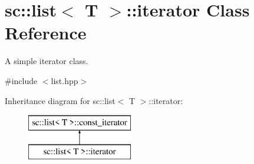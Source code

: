 \hypertarget{classsc_1_1list_1_1iterator}{}\section{sc\+:\+:list$<$ T $>$\+:\+:iterator Class Reference}
\label{classsc_1_1list_1_1iterator}


A simple iterator class.  




{\ttfamily \#include $<$list.\+hpp$>$}

Inheritance diagram for sc\+:\+:list$<$ T $>$\+:\+:iterator\+:\begin{figure}[H]
\begin{center}
\leavevmode
\includegraphics[height=2.000000cm]{classsc_1_1list_1_1iterator}
\end{center}
\end{figure}
